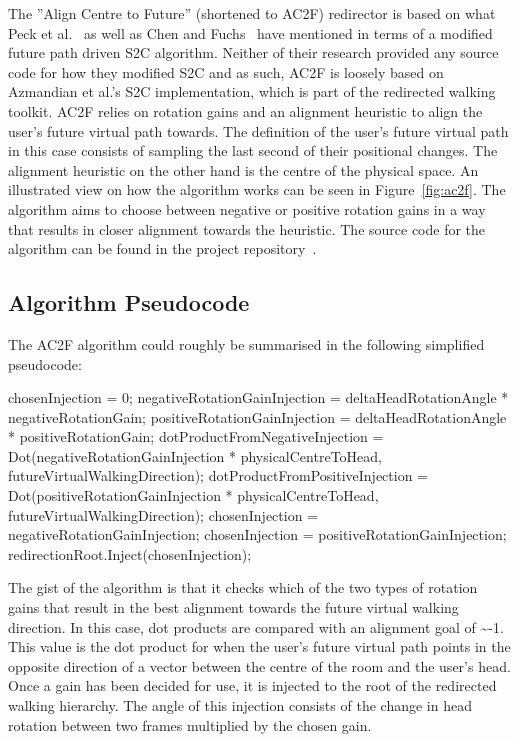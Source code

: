 The ''Align Centre to Future'' (shortened to AC2F) redirector is based on what Peck et al.~\cite{peck2010improved} as well as Chen and Fuchs~\cite{chen2017towards, chen2017supporting} have mentioned in terms of a modified future path driven S2C algorithm. Neither of their research provided any source code for how they modified S2C and as such, AC2F is loosely based on Azmandian et al.'s S2C implementation, which is part of the redirected walking toolkit. AC2F relies on rotation gains and an alignment heuristic to align the user's future virtual path towards. The definition of the user's future virtual path in this case consists of sampling the last second of their positional changes. The alignment heuristic on the other hand is the centre of the physical space. An illustrated view on how the algorithm works can be seen in Figure~\ref{fig:ac2f}. The algorithm aims to choose between negative or positive rotation gains in a way that results in closer alignment towards the heuristic. The source code for the algorithm can be found in the project repository~\cite{ac2fScript}.

\subsection{Algorithm Pseudocode}
The AC2F algorithm could roughly be summarised in the following simplified pseudocode:
\\
\begin{algorithmic}
\State chosenInjection = 0; 
    \State negativeRotationGainInjection = deltaHeadRotationAngle * negativeRotationGain;
    \State positiveRotationGainInjection = deltaHeadRotationAngle * positiveRotationGain;
    \State dotProductFromNegativeInjection = Dot(negativeRotationGainInjection * physicalCentreToHead, futureVirtualWalkingDirection);
    \State dotProductFromPositiveInjection = Dot(positiveRotationGainInjection * physicalCentreToHead, futureVirtualWalkingDirection);
        \State chosenInjection = negativeRotationGainInjection;
    \Else
        \State chosenInjection = positiveRotationGainInjection;
    \EndIf
\EndIf
\State redirectionRoot.Inject(chosenInjection);
\end{algorithmic}

\vspace{0.3cm}
The gist of the algorithm is that it checks which of the two types of rotation gains that result in the best alignment towards the future virtual walking direction. In this case, dot products are compared with an alignment goal of \textasciitilde-1. This value is the dot product for when the user's future virtual path points in the opposite direction of a vector between the centre of the room and the user's head. Once a gain has been decided for use, it is injected to the root of the redirected walking hierarchy. The angle of this injection consists of the change in head rotation between two frames multiplied by the chosen gain.

